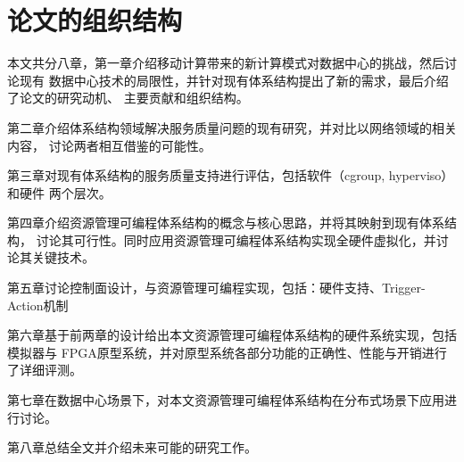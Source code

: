 \section{论文的组织结构}

本文共分八章，第一章介绍移动计算带来的新计算模式对数据中心的挑战，然后讨论现有
数据中心技术的局限性，并针对现有体系结构提出了新的需求，最后介绍了论文的研究动机、
主要贡献和组织结构。

第二章介绍体系结构领域解决服务质量问题的现有研究，并对比以网络领域的相关内容，
讨论两者相互借鉴的可能性。

第三章对现有体系结构的服务质量支持进行评估，包括软件（cgroup, hyperviso）和硬件
两个层次。

第四章介绍资源管理可编程体系结构的概念与核心思路，并将其映射到现有体系结构，
讨论其可行性。同时应用资源管理可编程体系结构实现全硬件虚拟化，并讨论其关键技术。

第五章讨论控制面设计，与资源管理可编程实现，包括：硬件支持、Trigger-Action机制

第六章基于前两章的设计给出本文资源管理可编程体系结构的硬件系统实现，包括模拟器与
FPGA原型系统，并对原型系统各部分功能的正确性、性能与开销进行了详细评测。

第七章在数据中心场景下，对本文资源管理可编程体系结构在分布式场景下应用进行讨论。

第八章总结全文并介绍未来可能的研究工作。

